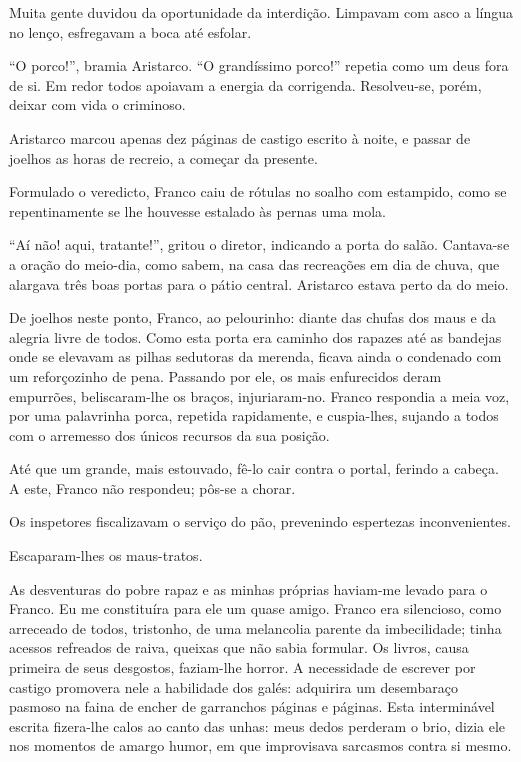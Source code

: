 Muita gente duvidou da
oportunidade da interdição. Limpavam com asco a língua no lenço,
esfregavam a boca até esfolar. 

``O porco!'', bramia Aristarco. ``O grandíssimo porco!'' 
repetia como um deus fora de si. Em redor todos
apoiavam a energia da corrigenda. Resolveu{}-se, porém, deixar com vida
o criminoso. 

Aristarco marcou apenas dez páginas de castigo escrito à
noite, e passar de joelhos as horas de recreio, a começar da presente.

Formulado o veredicto, Franco caiu de rótulas no soalho com estampido,
como se repentinamente se lhe houvesse estalado às pernas uma mola. 

``Aí não! aqui, tratante!'', gritou o diretor, indicando a porta do salão.
Cantava{}-se a oração do meio{}-dia, como sabem, na casa das recreações em
dia de chuva, que alargava três boas portas para o pátio central.
Aristarco estava perto da do meio. 

De joelhos neste ponto, Franco, ao
pelourinho: diante das chufas dos maus e da alegria livre de todos.
Como esta porta era caminho dos rapazes até as bandejas onde se
elevavam as pilhas sedutoras da merenda, ficava ainda o condenado com
um reforçozinho de pena. Passando por ele, os mais enfurecidos deram
empurrões, beliscaram{}-lhe os braços, injuriaram{}-no. Franco
respondia a meia voz, por uma palavrinha porca, repetida rapidamente, e
cuspia{}-lhes, sujando a todos com o arremesso dos únicos recursos da
sua posição. 

Até que um grande, mais estouvado, fê{}-lo cair contra o
portal, ferindo a cabeça. A este, Franco não respondeu; pôs{}-se a
chorar. 

Os inspetores fiscalizavam o serviço do pão, prevenindo
espertezas inconvenientes. 

Escaparam{}-lhes os maus{}-tratos. 

As desventuras do pobre rapaz e as minhas próprias haviam{}-me levado para
o Franco. Eu me constituíra para ele um quase amigo. Franco era
silencioso, como arreceado de todos, tristonho, de uma melancolia
parente da imbecilidade; tinha acessos refreados de raiva, queixas que
não sabia formular. Os livros, causa primeira de seus desgostos,
faziam{}-lhe horror. A necessidade de escrever por castigo promovera
nele a habilidade dos galés: adquirira um desembaraço pasmoso na faina
de encher de garranchos páginas e páginas. Esta interminável escrita
fizera{}-lhe calos ao canto das unhas: meus dedos perderam o brio,
dizia ele nos momentos de amargo humor, em que improvisava sarcasmos
contra si mesmo. 

